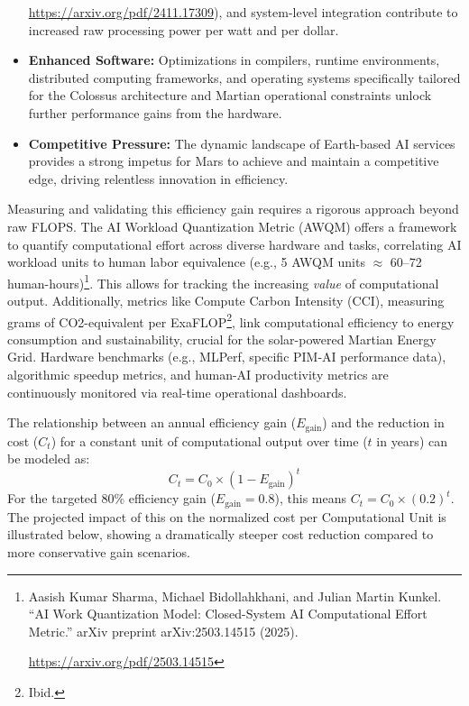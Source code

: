 \documentclass[fontsize=10pt, oneside, DIV=calc]{scrartcl}
\begin{document}
\begin{itemize}
{\href{https://arxiv.org/pdf/2411.17309}\url{https://arxiv.org/pdf/2411.17309}}), and system-level integration contribute to increased raw processing power per watt and per dollar.
    \item \textbf{Enhanced Software:} Optimizations in compilers, runtime environments, distributed computing frameworks, and operating systems specifically tailored for the Colossus architecture and Martian operational constraints unlock further performance gains from the hardware.
    \item \textbf{Competitive Pressure:} The dynamic landscape of Earth-based AI services provides a strong impetus for Mars to achieve and maintain a competitive edge, driving relentless innovation in efficiency.
\end{itemize}

\medskip

\noindent
Measuring and validating this efficiency gain requires a rigorous approach beyond raw FLOPS. The AI Workload Quantization Metric (AWQM) offers a framework to quantify computational effort across diverse hardware and tasks, correlating AI workload units to human labor equivalence (e.g., 5 AWQM units $\approx$ 60--72 human-hours)\footnote{Aasish Kumar Sharma, Michael Bidollahkhani, and Julian Martin Kunkel. ``AI Work Quantization Model: Closed-System AI Computational Effort Metric.'' arXiv preprint arXiv:2503.14515 (2025). 















\href{https://arxiv.org/pdf/2503.14515}\url{https://arxiv.org/pdf/2503.14515}}. This allows for tracking the increasing \textit{value} of computational output. Additionally, metrics like Compute Carbon Intensity (CCI), measuring grams of CO2-equivalent per ExaFLOP\footnote{Ibid.}, link computational efficiency to energy consumption and sustainability, crucial for the solar-powered Martian Energy Grid. Hardware benchmarks (e.g., MLPerf, specific PIM-AI performance data), algorithmic speedup metrics, and human-AI productivity metrics are continuously monitored via real-time operational dashboards.

\medskip

\noindent
The relationship between an annual efficiency gain ($E_{\text{gain}}$) and the reduction in cost ($C_t$) for a constant unit of computational output over time ($t$ in years) can be modeled as:
\begin{equation}
C_t = C_0 \times (1 - E_{\text{gain}})^t
\end{equation}
For the targeted 80\% efficiency gain ($E_{\text{gain}} = 0.8$), this means $C_t = C_0 \times (0.2)^t$. The projected impact of this on the normalized cost per Computational Unit is illustrated below, showing a dramatically steeper cost reduction compared to more conservative gain scenarios.
\end{document}
